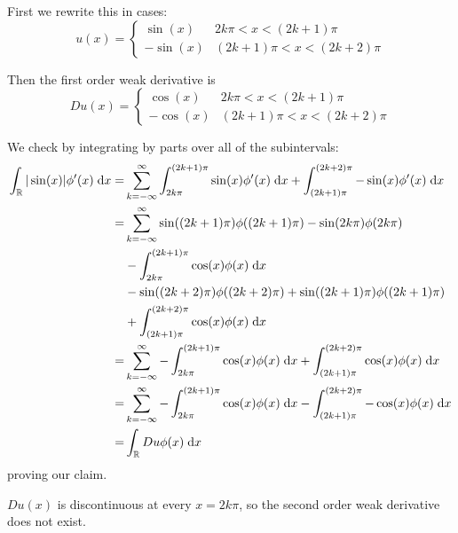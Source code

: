 \begin{enumerate}
  First we rewrite this in cases:
  $$
  u(x) =
  \begin{cases}
    \sin(x) & 2 k \pi < x < (2 k + 1) \pi\\
    -\sin(x) & (2 k + 1) \pi < x < (2 k + 2) \pi
  \end{cases}
  $$

  Then the first order weak derivative is
  $$
  Du(x) =
  \begin{cases}
    \cos(x) & 2 k \pi < x < (2 k + 1) \pi\\
    -\cos(x) & (2 k + 1) \pi < x < (2 k + 2) \pi
  \end{cases}
  $$

  We check by integrating by parts over all of the subintervals:
  \begin{align*}
    \int_{\mathbb{R}} |\sin(x)| \phi'(x) \;\mathrm{d}x
      = &\sum_{k=-\infty}^\infty \int_{2 k \pi}^{(2 k + 1) \pi} \sin(x) \phi'(x) \;\mathrm{d}x
         + \int_{(2 k + 1) \pi}^{(2 k + 2) \pi} -\sin(x) \phi'(x) \;\mathrm{d}x\\
      = &\sum_{k=-\infty}^\infty \sin((2 k + 1) \pi) \phi((2 k + 1) \pi) - \sin(2 k \pi) \phi(2 k \pi)\\
         &- \int_{2 k \pi}^{(2 k + 1) \pi} \cos(x) \phi(x) \;\mathrm{d}x\\
         &- \sin((2 k + 2) \pi) \phi((2 k + 2) \pi) + \sin((2 k + 1) \pi) \phi((2 k + 1) \pi)\\
         &+ \int_{(2 k + 1) \pi}^{(2 k + 2) \pi} \cos(x) \phi(x) \;\mathrm{d}x\\
      = &\sum_{k=-\infty}^\infty -\int_{2 k \pi}^{(2 k + 1) \pi} \cos(x) \phi(x) \;\mathrm{d}x
          + \int_{(2 k + 1) \pi}^{(2 k + 2) \pi} \cos(x) \phi(x) \;\mathrm{d}x\\
      = &\sum_{k=-\infty}^\infty -\int_{2 k \pi}^{(2 k + 1) \pi} \cos(x) \phi(x) \;\mathrm{d}x
          - \int_{(2 k + 1) \pi}^{(2 k + 2) \pi} -\cos(x) \phi(x) \;\mathrm{d}x\\
      = &\int_{\mathbb{R}} Du \phi(x) \;\mathrm{d}x
  \end{align*}
  proving our claim.

  $Du(x)$ is discontinuous at every $x = 2 k \pi$, so the second order weak derivative does not exist.
\end{enumerate}
